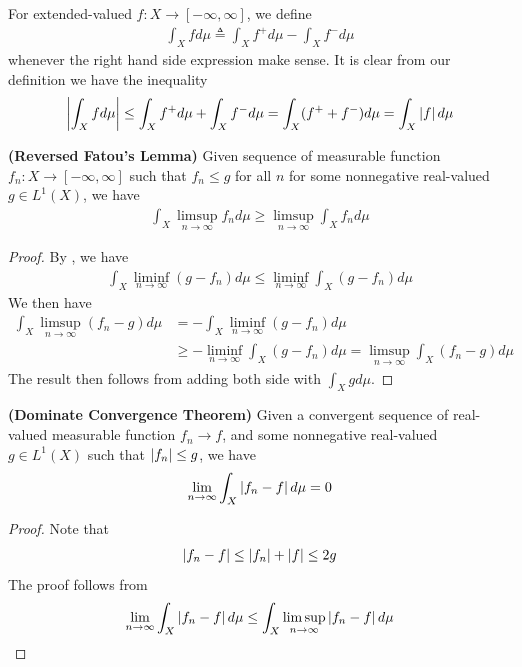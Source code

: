 \documentclass{report}
\begin{document}
\begin{mdframed}

For extended-valued $f:X\rightarrow [-\infty,\infty]$, we define 
\begin{align*}
\int_X fd\mu \triangleq  \int_X f^+ d\mu - \int_X f^-d\mu
\end{align*}
whenever the right hand side expression make sense. It is clear from our definition we have the inequality 
\begin{align*}
  \left|\int_X fd\mu\right|\leq \int_X f^+d\mu + \int_X f^-d\mu =\int_X (f^++f^-)d\mu =\int_X \left|f\right|d\mu
\end{align*}
\end{mdframed}
\begin{theorem}
\label{RFL}
\textbf{(Reversed Fatou's Lemma)} Given sequence of measurable function $f_n:X\rightarrow [-\infty,\infty]$ such that $f_n\leq g$ for all $n$ for some nonnegative real-valued  $g\in L^1(X)$, we have 
\begin{align*}
\int_X \limsup_{n\to\infty} f_n d\mu \geq \limsup_{n\to\infty} \int_X f_nd\mu
\end{align*}
\end{theorem}
\begin{proof}
By , we have 
\begin{align*}
\int_X \liminf_{n\to\infty} (g-f_n)d\mu \leq \liminf_{n\to\infty} \int_X (g- f_n)d\mu
\end{align*}
We then have 
\begin{align*}
\int_X \limsup_{n\to\infty} (f_n-g) d\mu &=-\int_X \liminf_{n\to\infty} (g-f_n)d\mu \\
&\geq - \liminf_{n\to\infty} \int_X (g- f_n)d\mu= \limsup_{n\to\infty} \int_X (f_n-g)d\mu
\end{align*}
The result then follows from adding both side with $\int_X gd\mu$. 
\end{proof}
\begin{theorem}
\label{DCTg}
  \textbf{(Dominate Convergence Theorem)} Given a convergent sequence of real-valued measurable function $f_n\to f$,  and some nonnegative real-valued $g \in L^1(X)$ such that $\left|f_n\right|\leq g$, we have
\begin{align*}
 \lim_{n\to \infty}\int_X \left|f_n-f\right|d\mu =0 
\end{align*}
\end{theorem}
\begin{proof}
Note that 
\begin{align*}
\left|f_n-f\right|\leq \left|f_n\right|+\left|f\right|\leq 2g
\end{align*}
The proof follows from 
\begin{align*}
\lim_{n\to \infty} \int_X \left|f_n-f\right|d\mu \leq \int_X \limsup_{n\to\infty} \left|f_n-f\right|d\mu
\end{align*}
\end{proof}
\end{document}
